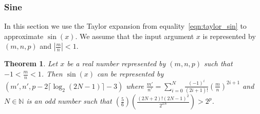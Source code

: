 \documentclass{article}
\newcommand{\nat}{\mathbb{N}}
\newtheorem{mytheorem}{Theorem}
\numberwithin{mytheorem}{section}
\newcommand{\taylorsin}[3] {\sum_{i=#1}^{#2}\frac{(-1)^i}{(2i+1)!}{#3}^{2i+1}}
\begin{document}
\subsubsection{Sine}\label{subsubsec:base_sin}
In this section we use the Taylor expansion from equality~\eqref{eqn:taylor_sin} to approximate $\sin(x)$. We assume that the input argument $x$ is represented by $(m,n,p)$ and $|\frac{m}{n}|<1$.
\begin{mytheorem}\label{thm:base_sin}
Let $x$ be a real number represented by $(m,n,p)$ such that $-1<\frac{m}{n}<1$. Then $\sin(x)$ can be represented by $(m',n',p-2\lceil\log_2(2N-1)\rceil-3)$ where $\frac{m'}{n'}=\taylorsin{0}{N}{(\frac{m}{n})}$ and $N\in\nat$ is an odd number such that $(\frac{5}{6})(\frac{(2N+2)!(2N-1)^2}{2^{2N}})>2^p$. 
\end{mytheorem}
\end{document}
